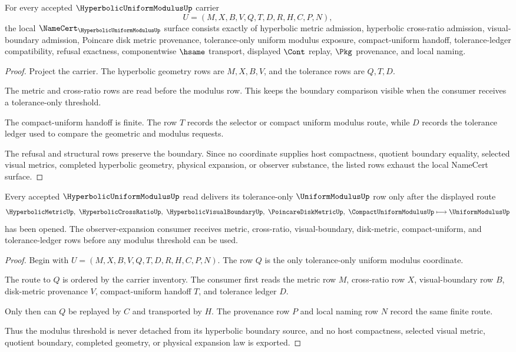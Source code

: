 \begin{theorem}
\label{thm:hyperbolic-uniform-modulus-namecert-obligations}
For every accepted $\HyperbolicUniformModulusUp$ carrier
$$
U=(M,X,B,V,Q,T,D,R,H,C,P,N),
$$
the local $\NameCert_{\HyperbolicUniformModulusUp}$ surface consists exactly of hyperbolic metric admission, hyperbolic cross-ratio admission, visual-boundary admission, Poincare disk metric provenance, tolerance-only uniform modulus exposure, compact-uniform handoff, tolerance-ledger compatibility, refusal exactness, componentwise $\hsame$ transport, displayed $\Cont$ replay, $\Pkg$ provenance, and local naming.
\end{theorem}
\begin{proof}
Project the carrier. The hyperbolic geometry rows are $M,X,B,V$, and the tolerance rows are $Q,T,D$.

The metric and cross-ratio rows are read before the modulus row. This keeps the boundary comparison visible when the consumer receives a tolerance-only threshold.

The compact-uniform handoff is finite. The row $T$ records the selector or compact uniform modulus route, while $D$ records the tolerance ledger used to compare the geometric and modulus requests.

The refusal and structural rows preserve the boundary. Since no coordinate supplies host compactness, quotient boundary equality, selected visual metrics, completed hyperbolic geometry, physical expansion, or observer substance, the listed rows exhaust the local NameCert surface.
\end{proof}

\begin{theorem}
\label{thm:hyperbolic-uniform-modulus-cross-ratio-route}
Every accepted $\HyperbolicUniformModulusUp$ read delivers its tolerance-only $\UniformModulusUp$ row only after the displayed route
$$
\HyperbolicMetricUp,\ \HyperbolicCrossRatioUp,\ \HyperbolicVisualBoundaryUp,\ \PoincareDiskMetricUp,\ \CompactUniformModulusUp
\longmapsto
\UniformModulusUp
$$
has been opened. The observer-expansion consumer receives metric, cross-ratio, visual-boundary, disk-metric, compact-uniform, and tolerance-ledger rows before any modulus threshold can be used.
\end{theorem}
\begin{proof}
Begin with $U=(M,X,B,V,Q,T,D,R,H,C,P,N)$. The row $Q$ is the only tolerance-only uniform modulus coordinate.

The route to $Q$ is ordered by the carrier inventory. The consumer first reads the metric row $M$, cross-ratio row $X$, visual-boundary row $B$, disk-metric provenance $V$, compact-uniform handoff $T$, and tolerance ledger $D$.

Only then can $Q$ be replayed by $C$ and transported by $H$. The provenance row $P$ and local naming row $N$ record the same finite route.

Thus the modulus threshold is never detached from its hyperbolic boundary source, and no host compactness, selected visual metric, quotient boundary, completed geometry, or physical expansion law is exported.
\end{proof}

